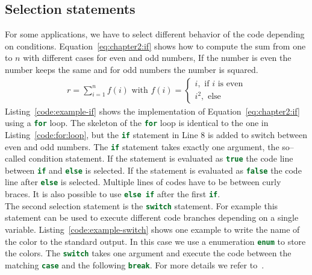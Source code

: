 \subsection{Selection statements}
For some applications, we have to select different behavior of the code depending on conditions. Equation~\ref{eq:chapter2:if} shows how to compute the sum from one to $n$ with different cases for even and odd numbers, If the number is even the number keeps the same and for odd numbers the number is squared.
\begin{align}
r = \sum\limits_{i=1}^n f(i) \text{  with  } f(i) = 
\begin{cases}
i, \text{ if } i \text{ is even} \\
i^2, \text{ else}
\end{cases}
\label{eq:chapter2:if}
\end{align}
Listing~\ref{code:example-if} shows the implementation of Equation~\ref{eq:chapter2:if} using a \lstinline[language=c++]{for} loop. The skeleton of the \lstinline[language=c++]{for} loop is identical to the one in Listing~\ref{code:for:loop}, but the \lstinline[language=c++]{if} statement in Line 8 is added to switch between even and odd numbers. The \lstinline[language=c++]{if} statement takes exactly one argument, the so--called condition statement. If the statement is evaluated as \lstinline[language=c++]{true} the code line between \lstinline[language=c++]{if} and \lstinline[language=c++]{else} is selected.  If the statement is evaluated as \lstinline[language=c++]{false} the code line after \lstinline[language=c++]{else} is selected. Multiple lines of codes have to be between curly braces. It is also possible to use \lstinline[language=c++]{else if} after the first \lstinline[language=c++]{if}. \\




The second selection statement is the \lstinline[language=c++]{switch} statement. For example this statement can be used to execute different code branches depending on a single variable. Listing~\ref{code:example-switch} shows one example to write the name of the color to the standard output. In this case we use a enumeration \lstinline[language=c++]{enum} to store the colors. The \lstinline[language=c++]{switch} takes one argument and execute the code between the matching \lstinline[language=c++]{case} and the following \lstinline[language=c++]{break}. For more details we refer to~\cite[Chapter~2]{andrew2000accelerated}.  


